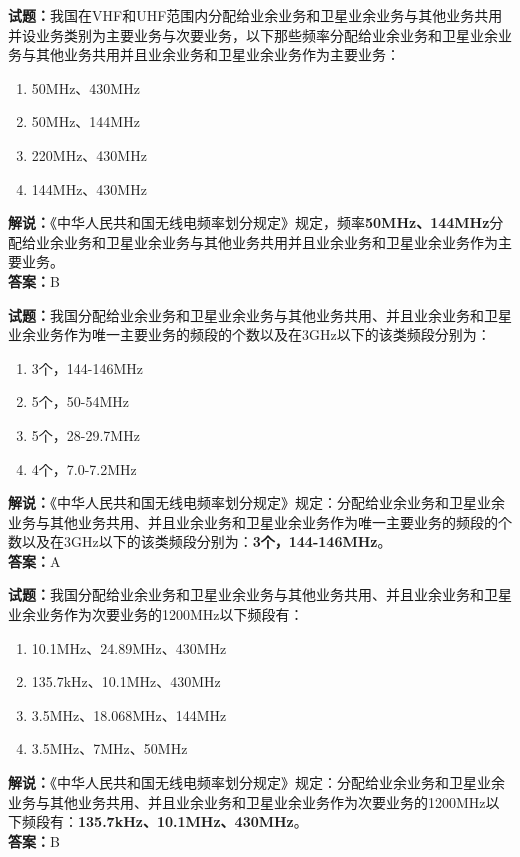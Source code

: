 \documentclass{ctexbook}
\begin{document}
\noindent\textbf{试题：}我国在VHF和UHF范围内分配给业余业务和卫星业余业务与其他业务共用并设业务类别为主要业务与次要业务，以下那些频率分配给业余业务和卫星业余业务与其他业务共用并且业余业务和卫星业余业务作为主要业务：
\begin{enumerate}[leftmargin=3em]
  \item 50\unit{\MHz}、430\unit{\MHz}
  \item 50\unit{\MHz}、144\unit{\MHz}
  \item 220\unit{\MHz}、430\unit{\MHz}
  \item 144\unit{\MHz}、430\unit{\MHz}
\end{enumerate}
\noindent\textbf{解说：}《中华人民共和国无线电频率划分规定》规定，频率\textbf{50\unit{\MHz}、144\unit{\MHz}}分配给业余业务和卫星业余业务与其他业务共用并且业余业务和卫星业余业务作为主要业务。\\\noindent\textbf{答案：}B

\bigskip

\noindent\textbf{试题：}我国分配给业余业务和卫星业余业务与其他业务共用、并且业余业务和卫星业余业务作为唯一主要业务的频段的个数以及在3\unit{\GHz}以下的该类频段分别为：
\begin{enumerate}[leftmargin=3em]
  \item 3个，144-146\unit{\MHz}
  \item 5个，50-54\unit{\MHz}
  \item 5个，28-29.7\unit{\MHz}
  \item 4个，7.0-7.2\unit{\MHz}
\end{enumerate}
\noindent\textbf{解说：}《中华人民共和国无线电频率划分规定》规定：分配给业余业务和卫星业余业务与其他业务共用、并且业余业务和卫星业余业务作为唯一主要业务的频段的个数以及在3\unit{\GHz}以下的该类频段分别为：\textbf{3个，144-146\unit{\MHz}}。\\\noindent\textbf{答案：}A
\bigskip

\noindent\textbf{试题：}我国分配给业余业务和卫星业余业务与其他业务共用、并且业余业务和卫星业余业务作为次要业务的1200\unit{\MHz}以下频段有：
\begin{enumerate}[leftmargin=3em]
  \item 10.1\unit{\MHz}、24.89\unit{\MHz}、430\unit{\MHz}
  \item 135.7\unit{\kHz}、10.1\unit{\MHz}、430\unit{\MHz}
  \item 3.5\unit{\MHz}、18.068\unit{\MHz}、144\unit{\MHz}
  \item 3.5\unit{\MHz}、7\unit{\MHz}、50\unit{\MHz}
\end{enumerate}
\noindent\textbf{解说：}《中华人民共和国无线电频率划分规定》规定：分配给业余业务和卫星业余业务与其他业务共用、并且业余业务和卫星业余业务作为次要业务的1200\unit{\MHz}以下频段有：\textbf{135.7\unit{\kHz}、10.1\unit{\MHz}、430\unit{\MHz}}。\\\noindent\textbf{答案：}B
\end{document}
